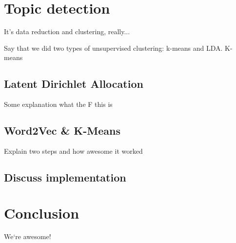 





\section{Topic detection}
\label{sec:topic_detection}
It's data reduction and clustering, really...

Say that we did two types of unsupervised clustering: k-means and LDA. K-means

\subsection{Latent Dirichlet Allocation}
Some explanation what the F this is

\lipsum[1]

\subsection{Word2Vec \& K-Means}
Explain two steps and how awesome it worked

\lipsum[1]

\subsection{Discuss implementation}



\section{Conclusion}
We`re awesome!

\lipsum[1-3]
